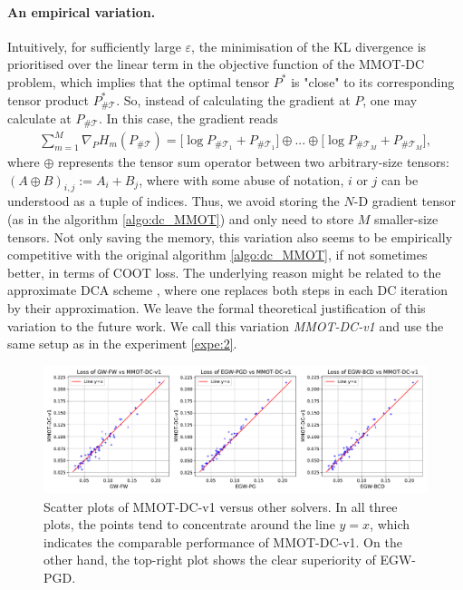 \paragraph{An empirical variation.} Intuitively, for sufficiently large $\varepsilon$, the minimisation of the KL divergence is prioritised
over the linear term in the objective function of the MMOT-DC problem, which implies that the optimal tensor $P^*$ is "close" to its
corresponding tensor product $P^*_{\# \mathcal T}$. So, instead of calculating the gradient at $P$, one may calculate at
$P_{\# \mathcal T}$. In this case, the gradient reads
\begin{equation}
  \begin{split}
    \sum_{m=1}^M \nabla_P H_m(P_{\# \mathcal T}) =
    \big[ \log P_{\# \mathcal T_1} + P_{\# \mathcal T_1} \big] \oplus ... \oplus \big[ \log P_{\# \mathcal T_M} + P_{\# \mathcal T_M} \big],
  \end{split}
\end{equation}
where $\oplus$ represents the tensor sum operator between two arbitrary-size tensors: $(A \oplus B)_{i,j}:= A_i + B_j$, where with some
abuse of notation, $i$ or $j$ can be understood as a tuple of indices. Thus, we avoid storing the $N$-D gradient tensor (as in the
algorithm \ref{algo:dc_MMOT}) and only need to store $M$ smaller-size tensors. Not only saving the memory,
this variation also seems to be empirically competitive with the original algorithm \ref{algo:dc_MMOT}, if not sometimes better,
in terms of COOT loss. The underlying reason might be related to the approximate DCA scheme \citep{Thanh15}, where one replaces both
steps in each DC iteration by their approximation. We leave the formal theoretical justification of this variation to the future work.
We call this variation \textit{MMOT-DC-v1} and use the same setup as in the experiment \ref{expe:2}.
\begin{figure}[ht]
  \centering
  \includegraphics[width=\textwidth,height=\textheight,keepaspectratio]{./Chapitre2/fig/all_vs_MMOT-DC-v1.pdf}
  \caption{Scatter plots of MMOT-DC-v1 versus other solvers. In all three plots, the points tend to concentrate around the line $y=x$,
  which indicates the comparable performance of MMOT-DC-v1. On the other hand, the top-right plot shows the clear superiority of EGW-PGD.}
  \label{fig:coot_mmot_new}
\end{figure}

